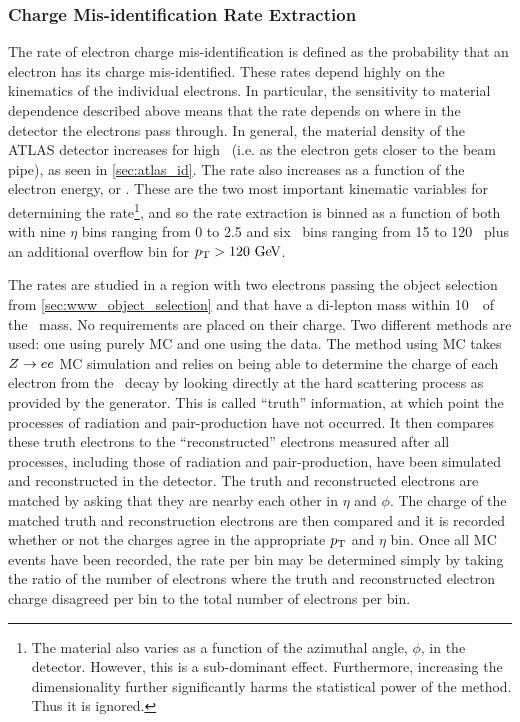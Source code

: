 \subsubsection{Charge Mis-identification Rate Extraction}

The rate of electron charge mis-identification is defined as 
the probability that an electron has its charge mis-identified.
These rates depend highly on the kinematics of the individual electrons.
In particular, the sensitivity to material dependence described above 
means that the rate depends on where in the detector the electrons
pass through. In general, the material density of the ATLAS
detector increases for high \eta~(i.e. as the electron gets closer to the
beam pipe), as seen in \sec\ref{sec:atlas_id}. The rate also increases as a function of the electron energy, 
or \pt. These are the two most important kinematic variables for determining
the rate\footnote{The material also varies as a function of the azimuthal angle,
$\phi$, in the detector. However, this is a sub-dominant effect. Furthermore,
increasing the dimensionality further significantly harms the statistical 
power of the method. Thus it is ignored.}, and 
so the rate extraction is binned as a function of both with nine $\eta$ 
bins ranging from 0 to 2.5 and six \pt~bins ranging from 15 to 120 \GeV~plus
an additional overflow bin for $\pt>120\GeV$.



The rates are studied in a region with two electrons passing the object
selection from \sec\ref{sec:www_object_selection} and that have
a di-lepton mass within 10~\GeV~of the \z~mass. No requirements are placed
on their charge. Two different methods
are used: one using purely MC and one using the data.
The method using MC takes $Z\rightarrow ee$ MC simulation 
and relies on being able to determine the charge of each electron from the 
\z~decay by looking 
directly at the hard scattering process as provided by the generator.
This is called ``truth'' information, at which point the processes of radiation
and pair-production have not occurred. It then compares
these truth electrons to the ``reconstructed'' electrons 
measured after all processes, including those of radiation and pair-production,
have been simulated and reconstructed
in the detector. The truth and reconstructed electrons
are matched by asking that they are nearby each other in $\eta$ and $\phi$.
The charge of the matched truth and reconstruction electrons 
are then compared and it is recorded whether or not the charges agree
in the appropriate $p_{\mathrm{T}}$ and $\eta$ bin. Once all MC events
have been recorded, the rate per bin may be determined simply 
by taking the ratio of the number of electrons where the truth and reconstructed
electron charge disagreed per bin to the total number of electrons per bin. 

